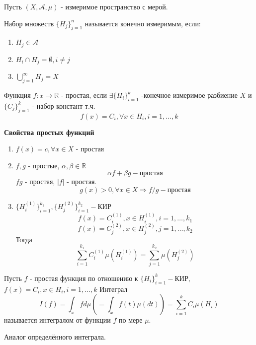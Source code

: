 \begin{definition}
	Пусть $(X, \mathcal{A}, \mu)$ - измеримое пространство с мерой.
	
	Набор множеств $\{ H_j \}_{j=1}^{n}$ называется конечно измеримым, если:
	\begin{enumerate}
		\item $H_j \in \mathcal{A}$
		\item $H_i \cap H_j = \emptyset, i \ne j$
		\item $\bigcup\limits_{j=1}^{\infty} H_j = X$
	\end{enumerate}
\end{definition}

\begin{definition}
	Функция $f: x \to \mathbb{R}$ - простая, если $\exists \{ H_i \}_{i=1}^k$ -конечное измеримое разбиение $X$ и $\{ C_j \}_{j=1}^k$ - набор констант т.ч.
	\[ f(x) = C_i, \forall x \in H_i, i = 1, \dots, k \]
\end{definition}

\textbf{Свойства простых функций}
\begin{enumerate}
	\item $f(x) = c, \forall x \in X$ - простая
	\item $f, g$ - простые,  $\alpha, \beta \in \mathbb{R}$
	\[ \alpha f + \beta g - \text{простая} \]
	$fg$ - простая, $|f|$ - простая.
	\[ g(x) > 0, \forall x \in X \Rightarrow f/g - \text{простая} \]
	\item $\{ H_i^{(1)} \}_{i=1}^{k_1}, \{ H_j^{(2)} \}_{i=1}^{k_2} - \text{КИР}$
	\[ f(x) = C_i^{(1)}, x \in H_i^{(1)}, i = 1, \dots, k_1 \]
	\[ f(x) = C_j^{(2)}, x \in H_j^{(2)}, j = 1, \dots, k_2 \]
	Тогда
	\[ \sum_{i=1}^{k_1} C_i^{(1)} \mu (H_i^{(1)}) = \sum_{j=1}^{k_2} \mu (H_j^{(2)}) \]
\end{enumerate}

\begin{definition}
	Пусть $f$ - простая функция по отношению к $\{ H_i \}_{i=1}^{k} - \text{КИР}$, $f(x) = C_i, x \in H_i, i = 1, \dots, k$
	Интеграл
	\[ I(f) = \int_{x} f d \mu \left( = \int_{x} f(t) \mu (dt) \right) = \sum_{i=1}^{k} C_i \mu (H_i) \]
	называется интегралом от функции $f$ по мере $\mu$.
\end{definition}
\begin{remark}
	Аналог определённого интеграла.
\end{remark}

